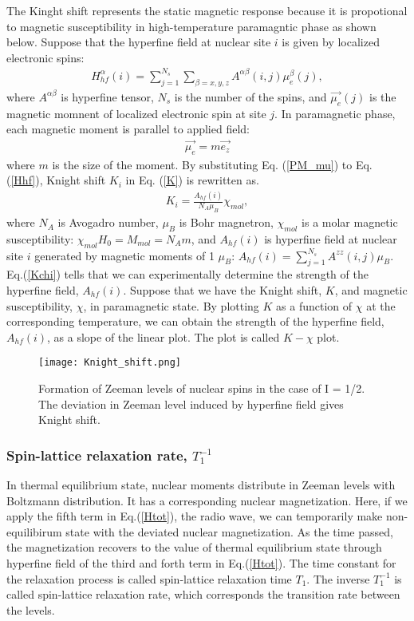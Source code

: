 The Kinght shift represents the static magnetic response because it is propotional to magnetic susceptibility in high-temperature paramagntic phase as shown below.
Suppose that the hyperfine field at nuclear site $i$ is given by localized electronic spins:
\begin{align}
\label{Hhf}
H^\alpha_{hf}(i) = \sum^{N_s}_{j = 1}\sum_{\beta = x,y,z}A^{\alpha\beta}(i, j)\mu^\beta_e(j),
\end{align}
where $A^{\alpha\beta}$ is hyperfine tensor, $N_s$ is the number of the spins, and $\vec{\mu_e}(j)$ is the magnetic momnent of localized electronic spin at site $j$.
In paramagnetic phase, each magnetic moment is parallel to applied field:
\begin{align}
\label{PM_mu}
\vec{\mu_e} = m\vec{e_z}
\end{align}
where $m$ is the size of the moment.
By substituting Eq. (\ref{PM_mu}) to Eq. (\ref{Hhf}), Knight shift $K_i$ in Eq. (\ref{K}) is rewritten as.
\begin{align}
K_i = \frac{A_{hf}(i)}{N_A\mu_B}\chi_{mol},
\label{Kchi}
\end{align}
where $N_A$ is Avogadro number, $\mu_B$ is Bohr magnetron, $\chi_{mol}$ is a molar magnetic susceptibility: $\chi_{mol} H_0 = M_{mol} = N_A m$,
and $A_{hf}(i)$ is hyperfine field at nuclear site $i$ generated by magnetic moments of 1 $\mu_B$: $A_{hf}(i) = \sum^{N_s}_{j = 1}A^{zz}(i, j)\mu_B$.
Eq.(\ref{Kchi}) tells that we can experimentally determine the strength of the hyperfine field, $A_{hf}(i)$.
Suppose that we have the Knight shift, $K$, and magnetic susceptibility, $\chi$, in paramagnetic state.
By plotting $K$ as a function of $\chi$ at the corresponding temperature, we can obtain the strength of the hyperfine field, $A_{hf}(i)$, as a slope of the linear plot.
The plot is called $K-\chi$ plot.

\begin{figure}
  \centering
  \texttt{[image: Knight\_shift.png]}
  \caption{Formation of Zeeman levels of nuclear spins in the case of I = 1/2.
  The deviation in Zeeman level induced by hyperfine field gives Knight shift.}
  \label{Knight_shift}
\end{figure}



\subsubsection{Spin-lattice relaxation rate, $T^{-1}_1$}
In thermal equilibrium state, nuclear moments distribute in Zeeman levels with Boltzmann distribution.
It has a corresponding nuclear magnetization.
Here, if we apply the fifth term in Eq.(\ref{Htot}), the radio wave, we can temporarily make non-equilibirum state with the deviated nuclear magnetization.
As the time passed, the magnetization recovers to the value of thermal equilibrium state through hyperfine field of the third and forth term in Eq.(\ref{Htot}).
The time constant for the relaxation process is called spin-lattice relaxation time $T_1$.
The inverse $T^{-1}_1$ is called spin-lattice relaxation rate, which corresponds the transition rate between the levels.

